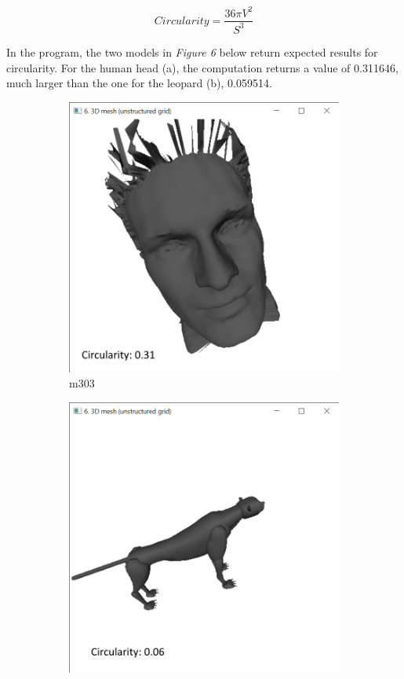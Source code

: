 \documentclass{bigdata}
\begin{document}
\begin{equation}
Circularity = \frac{36\pi V^2}{S^3}
\end{equation}

In the program, the two models in \textit{Figure 6} below return expected results for circularity. For the human head (a), the computation returns a value of 0.311646, much larger than the one for the leopard (b), 0.059514.

\begin{figure}[h!]
	\centering
	\begin{subfigure}[b]{0.4\linewidth}
		\includegraphics[width=\linewidth]{Pictures/Part3/circHead.png}
		\caption{m303}
	\end{subfigure}
	\begin{subfigure}[b]{0.4\linewidth}
		\includegraphics[width=\linewidth]{Pictures/Part3/circLeo.png}

\end{subfigure}
\end{figure}
\end{document}
